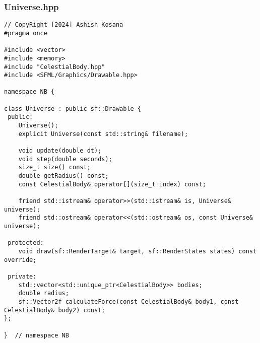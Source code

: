 \documentclass[12pt]{article}
\begin{document}
\subsubsection{Universe.hpp}
\begin{lstlisting}[style=cppcode]
// CopyRight [2024] Ashish Kosana
#pragma once

#include <vector>
#include <memory>
#include "CelestialBody.hpp"
#include <SFML/Graphics/Drawable.hpp>

namespace NB {

class Universe : public sf::Drawable {
 public:
    Universe();
    explicit Universe(const std::string& filename);

    void update(double dt);
    void step(double seconds);
    size_t size() const;
    double getRadius() const;
    const CelestialBody& operator[](size_t index) const;

    friend std::istream& operator>>(std::istream& is, Universe& universe);
    friend std::ostream& operator<<(std::ostream& os, const Universe& universe);

 protected:
    void draw(sf::RenderTarget& target, sf::RenderStates states) const override;

 private:
    std::vector<std::unique_ptr<CelestialBody>> bodies;
    double radius;
    sf::Vector2f calculateForce(const CelestialBody& body1, const CelestialBody& body2) const;
};

}  // namespace NB


\end{lstlisting}
\end{document}
